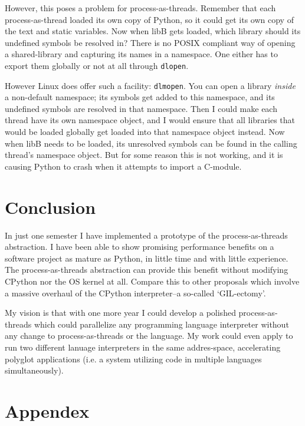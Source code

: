 \documentclass[letterpaper,twocolumn,10pt]{article}
\begin{document}
However, this poses a problem for process-as-threads.
Remember that each process-as-thread loaded its own copy of Python, so it could get its own copy of the text and static variables.
Now when libB gets loaded, which library should its undefined symbols be resolved in?
There is no POSIX compliant way of opening a shared-library and capturing its names in a namespace.
One either has to export them globally or not at all through \texttt{dlopen}.

However Linux does offer such a facility: \texttt{dlmopen}.
You can open a library \textit{inside} a non-default namespace; its symbols get added to this namespace, and its undefined symbols are resolved in that namespace.
Then I could make each thread have its own namespace object, and I would ensure that all libraries that would be loaded globally get loaded into that namespace object instead.
Now when libB needs to be loaded, its unresolved symbols can be found in the calling thread's namespace object.
But for some reason this is not working, and it is causing Python to crash when it attempts to import a C-module.

\section{Conclusion}


  In just one semester I have implemented a prototype of the process-as-threads abstraction.
  I have been able to show promising performance benefits on a software project as mature as Python, in little time and with little experience.
  The process-as-threads abstraction can provide this benefit without modifying CPython nor the OS kernel at all.
  Compare this to other proposals which involve a massive overhaul of the CPython interpreter--a so-called `GIL-ectomy'.

  My vision is that with one more year I could develop a polished process-as-threads which could parallelize any programming language interpreter without any change to process-as-threads or the language.
  My work could even apply to run two different lanuage interpreters in the same addres-space, accelerating polyglot applications (i.e. a system utilizing code in multiple languages simultaneously).

\section*{Appendex}
\end{document}
